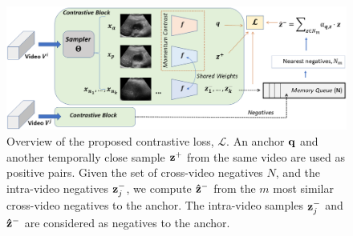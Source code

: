 \begin{figure}[t]
    \centering
    \includegraphics[width=0.9\linewidth]{figs/usucl/arch1.png}
    \caption[Overview of the proposed contrastive framework]{Overview of the proposed contrastive loss, $\mathcal{L}$. An anchor $\vb{q}$ and another temporally close sample $\vb{z}^+$ from the same video are used as positive pairs. Given the set of cross-video negatives $N$, and the intra-video negatives $\vb{z}_j^-$, we compute $\vb{\hat{z}}^-$ from the $m$ most similar cross-video negatives to the anchor. The intra-video samples $\vb{z}_j^-$ and $\vb{\hat{z}}^-$ are considered as negatives to the anchor.}
    \label{usucl_fig:my_label}
\end{figure}

